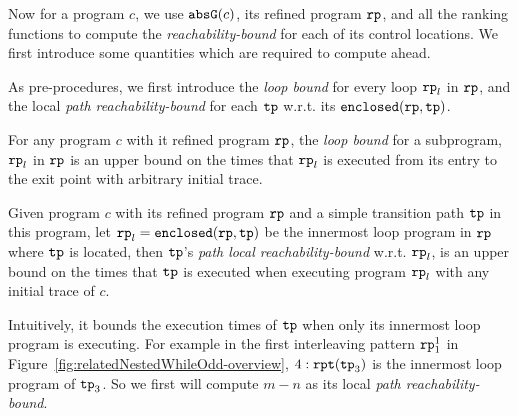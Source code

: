 
Now for a program $c$, we use $\mathtt{abs}{\mathtt{G}}(c)$, its refined program $\mathtt{rp}$, and all the ranking functions to compute the \emph{reachability-bound} for each of its control locations.
We first introduce some quantities which are required to compute ahead.

As pre-procedures, we first introduce the \emph{loop bound} for every loop $\mathtt{rp}_l$ in $\mathtt{rp}$, and the local \emph{path reachability-bound} for each $\mathtt{tp}$ w.r.t. its $\mathtt{enclosed}(\mathtt{rp}, \mathtt{tp})$.
\begin{defn}
 For any program $c$ with it refined program $\mathtt{rp}$,
 the \emph{loop bound}
 for a subprogram, $\mathtt{rp}_l$ in $\mathtt{rp}$ is an upper bound on the times that $\mathtt{rp}_l$ is executed from its entry to the exit point with arbitrary initial trace.
\end{defn}
% 
\begin{defn}
 Given program $c$ with its refined program $\mathtt{rp}$ and a simple transition path $\mathtt{tp}$ in this program, 
 let $\mathtt{rp}_l = \mathtt{enclosed}(\mathtt{rp}, \mathtt{tp})$ be the innermost loop program in $\mathtt{rp}$ where $\mathtt{tp}$ is located,
 then $\mathtt{tp}$'s \emph{path local reachability-bound} w.r.t. $\mathtt{rp}_l$, 
 is an upper bound on the times that $\mathtt{tp}$ is executed when executing program $\mathtt{rp}_l$ with any initial trace of $c$.
\end{defn}
Intuitively, it bounds the execution times of $\mathtt{tp}$ when only its innermost loop program is executing.
For example in the first interleaving pattern $\mathtt{rp}_1^1$ in Figure~\ref{fig:relatedNestedWhileOdd-overview}, 
$4:\mathtt{rpt}(\mathtt{tp}_3)$ is the innermost loop program of $\mathtt{tp}_3$.
So we first will compute $m - n$ as its local \emph{path reachability-bound}.


